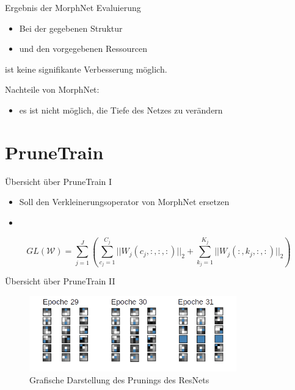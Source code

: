 \documentclass[10pt]{beamer}
\begin{document}
\begin{frame}{Ergebnis der MorphNet Evaluierung}
 \begin{itemize}
  \item Bei der gegebenen Struktur 
  \item und den vorgegebenen Ressourcen
 \end{itemize}
 ist keine signifikante Verbesserung möglich.
 
 Nachteile von MorphNet:
 \begin{itemize}
  \item es ist nicht möglich, die Tiefe des Netzes zu verändern
 \end{itemize}
\end{frame}

\section{PruneTrain}
\begin{frame}{Übersicht über PruneTrain I}
 \begin{itemize}
  \item Soll den Verkleinerungsoperator von MorphNet ersetzen
  \item 
 \end{itemize}
\begin{equation*}
GL(\mathcal{W})=\sum_{j=1}^{J} \left( \sum_{c_j=1}^{C_j} || W_{j} (c_j,:,:,:) ||_2 + \sum_{k_j=1}^{K_j} || W_{j}(:,k_j,:,:)||_2 \right)
 \label{equ:PTloss}
\end{equation*}

\end{frame}

\begin{frame}{Übersicht über PruneTrain II}
\begin{figure}[h]
 \centering
 \includegraphics[width=0.8\textwidth]{images/union.png}
 \caption{Grafische Darstellung des Prunings des ResNets}
\end{figure}
\end{frame}
\end{document}
